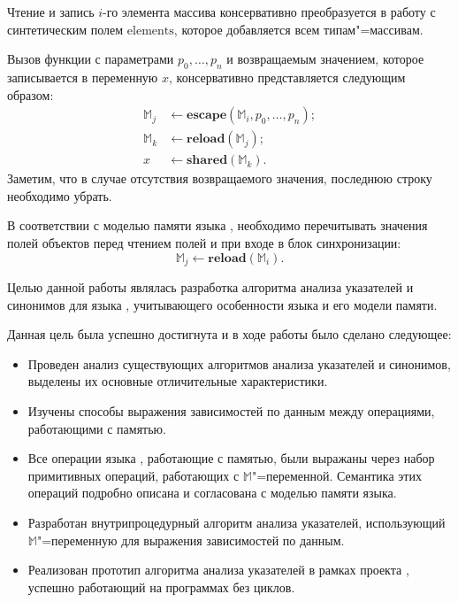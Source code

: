 \documentclass[14pt,titlepage,draft]{extarticle}
\newcommand{\java}{\eng{Java}\xspace}
\newcommand{\M}{\ensuremath{\mathbb{M}}}
\newcommand{\field}[1]{\mathrm{#1}}
\newcommand{\op}[1]{\mathbf{#1}}
\begin{document}
      Чтение и запись $i$-го элемента массива консервативно преобразуется в
      работу с синтетическим полем $\field{elements}$, которое добавляется всем
      типам"=массивам.

      Вызов функции с параметрами $p_0, \ldots, p_n$ и возвращаемым значением,
      которое записывается в переменную $x$, консервативно представляется
      следующим образом:
      \[\begin{aligned}
        \M_j &\gets \op{escape}(\M_i, p_0, \ldots, p_n); \\
        \M_k &\gets \op{reload}(\M_j); \\
        x    &\gets \op{shared}(\M_k).
      \end{aligned}\]
      Заметим, что в случае отсутствия возвращаемого значения, последнюю строку
      необходимо убрать.

      В соответствии с моделью памяти языка \java, необходимо перечитывать
      значения полей объектов перед чтением  полей и при входе в
      блок синхронизации:
      \[ \M_j \gets \op{reload}(\M_i). \]



    Целью данной работы являлась разработка алгоритма анализа указателей и
    синонимов для языка \java, учитывающего особенности языка и его модели
    памяти.

    Данная цель была успешно достигнута и в ходе работы было сделано следующее:
    \begin{itemize}
      \item Проведен анализ существующих алгоритмов анализа указателей и
            синонимов, выделены их основные отличительные характеристики.
      \item Изучены способы выражения зависимостей по данным между операциями,
            работающими с памятью.
      \item Все операции языка \java, работающие с памятью, были выражаны через
            набор примитивных операций, работающих с \M"=переменной.
            Семантика этих операций подробно описана и согласована с моделью
            памяти языка.
      \item Разработан внутрипроцедурный алгоритм анализа указателей,
            использующий \M"=переменную для выражения зависимостей по данным.
      \item Реализован прототип алгоритма анализа указателей в рамках проекта
            , успешно работающий на программах без циклов.
    \end{itemize}
\end{document}
